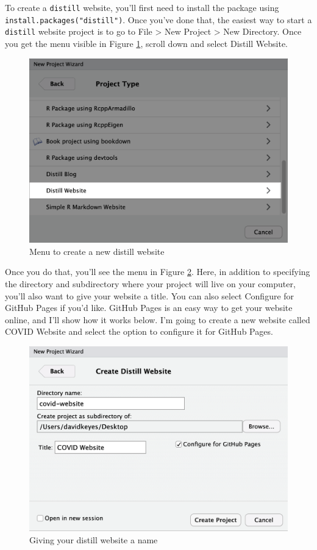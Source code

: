 \documentclass[
]{book}
\begin{document}
To create a \texttt{distill} website, you'll first need to install the package using \texttt{install.packages("distill")}. Once you've done that, the easiest way to start a \texttt{distill} website project is to go to File \textgreater{} New Project \textgreater{} New Directory. Once you get the menu visible in Figure \ref{fig:new-distill-website}, scroll down and select Distill Website.

\begin{figure}
\includegraphics[width=1\linewidth]{assets/new-distill-website} \caption{Menu to create a new distill website}\label{fig:new-distill-website}
\end{figure}

Once you do that, you'll see the menu in Figure \ref{fig:create-distill-website}. Here, in addition to specifying the directory and subdirectory where your project will live on your computer, you'll also want to give your website a title. You can also select Configure for GitHub Pages if you'd like. GitHub Pages is an easy way to get your website online, and I'll show how it works below. I'm going to create a new website called COVID Website and select the option to configure it for GitHub Pages.

\begin{figure}
\includegraphics[width=1\linewidth]{assets/create-distill-website} \caption{Giving your distill website a name}\label{fig:create-distill-website}
\end{figure}
\end{document}
